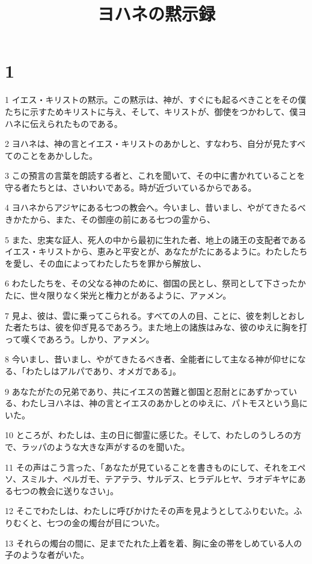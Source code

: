 

\title{ヨハネの黙示録}


\chapter{1}

\par 1 イエス・キリストの黙示。この黙示は、神が、すぐにも起るべきことをその僕たちに示すためキリストに与え、そして、キリストが、御使をつかわして、僕ヨハネに伝えられたものである。
\par 2 ヨハネは、神の言とイエス・キリストのあかしと、すなわち、自分が見たすべてのことをあかしした。
\par 3 この預言の言葉を朗読する者と、これを聞いて、その中に書かれていることを守る者たちとは、さいわいである。時が近づいているからである。
\par 4 ヨハネからアジヤにある七つの教会へ。今いまし、昔いまし、やがてきたるべきかたから、また、その御座の前にある七つの霊から、
\par 5 また、忠実な証人、死人の中から最初に生れた者、地上の諸王の支配者であるイエス・キリストから、恵みと平安とが、あなたがたにあるように。わたしたちを愛し、その血によってわたしたちを罪から解放し、
\par 6 わたしたちを、その父なる神のために、御国の民とし、祭司として下さったかたに、世々限りなく栄光と権力とがあるように、アァメン。
\par 7 見よ、彼は、雲に乗ってこられる。すべての人の目、ことに、彼を刺しとおした者たちは、彼を仰ぎ見るであろう。また地上の諸族はみな、彼のゆえに胸を打って嘆くであろう。しかり、アァメン。
\par 8 今いまし、昔いまし、やがてきたるべき者、全能者にして主なる神が仰せになる、「わたしはアルパであり、オメガである」。
\par 9 あなたがたの兄弟であり、共にイエスの苦難と御国と忍耐とにあずかっている、わたしヨハネは、神の言とイエスのあかしとのゆえに、パトモスという島にいた。
\par 10 ところが、わたしは、主の日に御霊に感じた。そして、わたしのうしろの方で、ラッパのような大きな声がするのを聞いた。
\par 11 その声はこう言った、「あなたが見ていることを書きものにして、それをエペソ、スミルナ、ペルガモ、テアテラ、サルデス、ヒラデルヒヤ、ラオデキヤにある七つの教会に送りなさい」。
\par 12 そこでわたしは、わたしに呼びかけたその声を見ようとしてふりむいた。ふりむくと、七つの金の燭台が目についた。
\par 13 それらの燭台の間に、足までたれた上着を着、胸に金の帯をしめている人の子のような者がいた。
